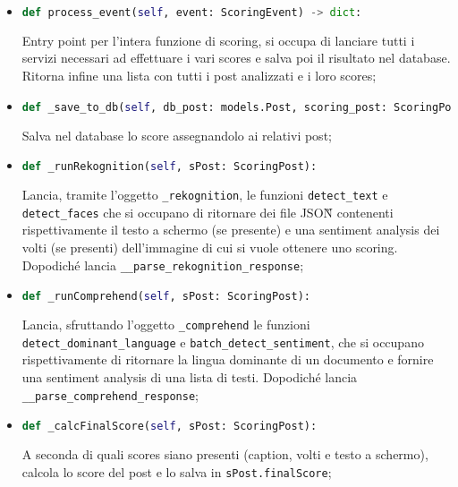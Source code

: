 \begin{itemize}
\item 
\begin{lstlisting}[language=Python, numbers=none]
def process_event(self, event: ScoringEvent) -> dict:
\end{lstlisting}
Entry point per l'intera funzione di scoring, si occupa di lanciare tutti i servizi 
necessari ad effettuare i vari scores e salva poi il risultato nel database. 
Ritorna infine una lista con tutti i post analizzati e i loro scores;

\item 
\begin{lstlisting}[language=Python, numbers=none]
def _save_to_db(self, db_post: models.Post, scoring_post: ScoringPost):
\end{lstlisting}
Salva nel database lo score assegnandolo ai relativi post;

\item 
\begin{lstlisting}[language=Python, numbers=none]
def _runRekognition(self, sPost: ScoringPost):
\end{lstlisting}
Lancia, tramite l'oggetto \verb+_rekognition+, le funzioni \verb+detect_text+ e 
\verb+detect_faces+ che si occupano di ritornare dei file JSON\G{} contenenti rispettivamente 
il testo a schermo (se presente) e una sentiment analysis dei volti (se presenti) 
dell'immagine di cui si vuole ottenere uno scoring. 
Dopodiché lancia \verb+__parse_rekognition_response+;

\item 
\begin{lstlisting}[language=Python, numbers=none]
def _runComprehend(self, sPost: ScoringPost):
\end{lstlisting}
Lancia, sfruttando l'oggetto \verb+_comprehend+ le funzioni \verb+detect_dominant_language+ 
e \verb+batch_detect_sentiment+, che si occupano rispettivamente di ritornare la lingua 
dominante di un documento e fornire una sentiment analysis di una lista di testi.
Dopodiché  lancia \verb+__parse_comprehend_response+;

\item 
\begin{lstlisting}[language=Python, numbers=none]
def _calcFinalScore(self, sPost: ScoringPost):
\end{lstlisting}
A seconda di quali scores siano presenti (caption, volti e testo a schermo), calcola 
lo score del post e lo salva in \verb+sPost.finalScore+;
   


\end{itemize}
